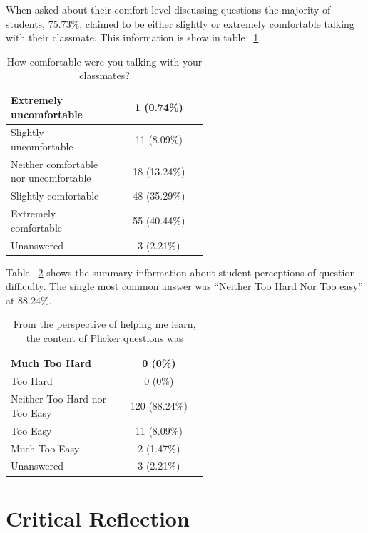 \documentclass[12pt]{article}
\begin{document}
When asked about their comfort level discussing questions the majority of students, 75.73\%, claimed to be either slightly or extremely comfortable talking with their classmate. This information is show in table ~\ref{table:group_comfort}.

\begin{table}[ht]
\caption{How comfortable were you talking with your classmates?}
\begin{tabular}{p{0.55\linewidth}|c} %
\toprule
 \rowcolor{LightGray} 
 Extremely uncomfortable & 1 (0.74\%)\\\midrule 
 Slightly uncomfortable & 11 (8.09\%)\\\midrule 
 \rowcolor{LightGray}
 Neither comfortable nor uncomfortable & 18 (13.24\%)\\\midrule 
 Slightly comfortable & 48 (35.29\%)\\\midrule 
 \rowcolor{LightGray}
 Extremely comfortable & 55 (40.44\%)\\\midrule 
 Unanswered & 3 (2.21\%)\\\bottomrule 
\end{tabular}
\label{table:group_comfort}
\end{table}

Table ~\ref{table:questionDifficulty} shows the summary information about student perceptions of question difficulty. The single most common answer was ``Neither Too Hard Nor Too easy'' at 88.24\%. 

\begin{table}[ht]
\caption{From the perspective of helping me learn, the content of Plicker questions was}
\begin{tabular}{p{0.55\linewidth}|c} %
 \rowcolor{LightGray} 
 Much Too Hard & 0 (0\%)\\\midrule 
 Too Hard & 0 (0\%)\\\midrule 
 \rowcolor{LightGray}
 Neither Too Hard nor Too Easy & 120 (88.24\%)\\\midrule 
 Too Easy & 11 (8.09\%)\\\midrule 
 \rowcolor{LightGray}
 Much Too Easy & 2 (1.47\%)\\\midrule 
 Unanswered & 3 (2.21\%)\\\bottomrule 
\end{tabular}
\label{table:questionDifficulty}
\end{table}

\section{Critical Reflection}
\end{document}
